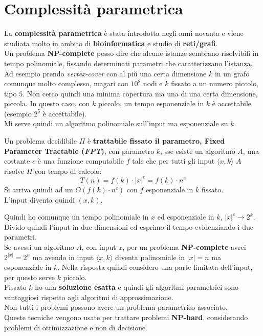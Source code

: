 \documentclass[a4paper,12pt, oneside]{book}
\begin{document}
\section{Complessità parametrica}
La \textbf{complessità parametrica} è stata introdotta negli anni novanta e
viene studiata molto in ambito di \textbf{bioinformatica} e studio di
\textbf{reti/grafi}.\\
Un problema \textbf{NP-complete} posso dire che alcune istanze sembrano
risolvibili in tempo polinomiale, fissando determinati parametri che
caratterizzano l'istanza. Ad esempio prendo \textit{vertex-cover} con al più una
certa dimensione $k$ in un grafo comunque molto complesso, magari con $10^8$
nodi e $k$ fissato a un numero piccolo, tipo $5$. Non cerco quindi una minima
copertura ma una di una certa dimensione, piccola. In questo caso, con $k$
piccolo, un tempo esponenziale in $k$ è accettabile (esempio $2^5$ è
accettabile).\\
Mi serve quindi un algoritmo polinomiale sull'input ma esponenziale su $k$.
\begin{definizione}
  Un problema decidibile $\Pi$ è \textbf{trattabile fissato il parametro, Fixed
    Parameter Tractable (\textit{FPT})}, con parametro $k$, sse esiste un
  algoritmo $A$, una costante $c$ è una funzione computabile $f$ tale che per
  tutti gli input $\langle x,k\rangle$ $A$ risolve $\Pi$ con tempo di calcolo:
  \[T(n) = f(k)\cdot|x|^c=f(k)\cdot n^c\]
  Si arriva quindi ad un $O(f(k)\cdot n^c)$ con $f$ esponenziale in $k$
  fissato. \\
  L'input diventa quindi $(x,k)$.
\end{definizione}
Quindi ho comunque un tempo polinomiale in $x$ ed esponenziale in $k$, $|x|^c\to
2^k$. Divido quindi l'input in due dimensioni ed esprimo il tempo evidenziando
i due parametri.\\
Se avessi un algoritmo $A$, con input $x$, per un problema \textbf{NP-complete}
avrei $2^{|x|}=2^n$ ma avendo in input $\langle x,k\rangle$ diventa polinomiale
in $|x|=n$ ma esponenziale in $k$. Nella risposta quindi considero una parte
limitata dell'input, per questo serve $k$ piccolo.\\
Fissato $k$ ho una \textbf{soluzione esatta} e quindi gli algoritmi parametrici
sono vantaggiosi rispetto agli algoritmi di approssimazione.\\
Non tutti i problemi possono avere un problema parametrico associato.\\
Queste tecniche vengono usate per trattare problemi \textbf{NP-hard},
considerando problemi di ottimizzazione e non di decisione.
\end{document}
